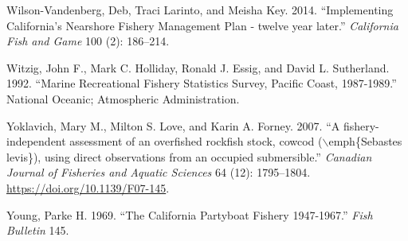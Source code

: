 \documentclass[
  english,
  a4paper,
]{article}
\newlength{\cslhangindent}
\newlength{\cslentryspacingunit} %
\newenvironment{CSLReferences}[2] %
 {%
  \setlength{\parindent}{0pt}
  \ifodd #1
  \let\oldpar\par
  \def\par{\hangindent=\cslhangindent\oldpar}
  \fi
  \setlength{\parskip}{#2\cslentryspacingunit}
 }%
 {}
\begin{document}
\begin{CSLReferences}{1}{0}
\leavevmode{}%
Wilson-Vandenberg, Deb, Traci Larinto, and Meisha Key. 2014. {``{Implementing California's Nearshore Fishery Management Plan - twelve year later}.''} \emph{California Fish and Game} 100 (2): 186--214.

\leavevmode{}%
Witzig, John F., Mark C. Holliday, Ronald J. Essig, and David L. Sutherland. 1992. {``{Marine Recreational Fishery Statistics Survey, Pacific Coast, 1987-1989}.''} National Oceanic; Atmospheric Administration.

\leavevmode{}%
Yoklavich, Mary M., Milton S. Love, and Karin A. Forney. 2007. {``{A fishery-independent assessment of an overfished rockfish stock, cowcod (\(\backslash\)emph{\{}Sebastes levis{\}}), using direct observations from an occupied submersible}.''} \emph{Canadian Journal of Fisheries and Aquatic Sciences} 64 (12): 1795--1804. \url{https://doi.org/10.1139/F07-145}.

\leavevmode{}%
Young, Parke H. 1969. {``{The California Partyboat Fishery 1947-1967}.''} \emph{Fish Bulletin} 145.

\end{CSLReferences}
\end{document}
